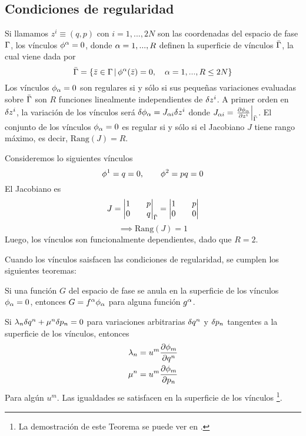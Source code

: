 \subsection{Condiciones de regularidad}
Si llamamos $z^{i}\equiv (q,p)$ con $i=1,...,2N$ son las coordenadas del espacio de fase $\Gamma $, los vínculos $\phi^\alpha =0$, donde $\alpha=1,...,R$ definen la superficie de vínculos $\bar{\Gamma}$, la cual viene dada por
\begin{equation}
  \bar{\Gamma}=\{\bar{z}\in \Gamma \, |\,  \phi^\alpha(\bar{z})=0, \quad \alpha=1,...,R\leq 2N\}
\end{equation}
Los vínculos $\phi_\alpha=0$ son regulares si y sólo si sus pequeñas variaciones evaluadas sobre $\bar{\Gamma}$ son $R$ funciones linealmente independientes de $\delta z^{i}$. A primer orden en $\delta z^{i}$, la variación de los vínculos será $\delta\phi_\alpha=J_{\alpha i}\delta z^{i}$ donde $J_{\a i}=\eval{\pdv{\f_\a }{z^{i}}}_{\bar{\G }}$. El conjunto de los vínculos $\phi_\alpha =0$ es regular si y sólo si el Jacobiano $J$ tiene rango máximo, es decir, $\text{Rang}(J)=R$.

\begin{ej}
	Consideremos lo siguientes vínculos
	\begin{equation}
  \phi^1=q=0,\qquad \phi^2=pq=0
\end{equation}
El Jacobiano es
\begin{equation}
  J=\mqty|1&&p\\0&&q|_{\bar{\G }}=\mqty|1&&p\\0&&0|
\end{equation}
\begin{equation}
  \implies \text{Rang}(J)=1
\end{equation}
Luego, los vínculos son funcionalmente dependientes, dado que $R=2$.
\end{ej}

Cuando los vínculos saisfacen las condiciones de regularidad, se cumplen los siguientes teoremas:
\begin{teor}\label{teo:1}
	Si una función $G$ del espacio de fase se anula en la superficie de los vínculos $\phi_\alpha =0$, entonces $G=f^\alpha \phi_\alpha $ para alguna función $g^\alpha $.
\end{teor}

\begin{teor}\label{teo:2}
	Si $\lambda_n \delta q^n+\mu ^n \delta p_n=0$ para variaciones arbitrarias $\delta q^n$ y $\delta p_n$ tangentes a la superficie de los vínculos, entonces
	\begin{align}
  \lambda_n &=u^m \pdv{\phi_m }{q^n }\\
  \mu^n  &=u^m\pdv{\phi_m }{p_n }
\end{align}
Para algún $u^m $. Las igualdades se satisfacen en la superficie de los vínculos \footnote{La demostración de este Teorema se puede ver en \cite{Henneaux:1994lbw}.}.
\end{teor}

